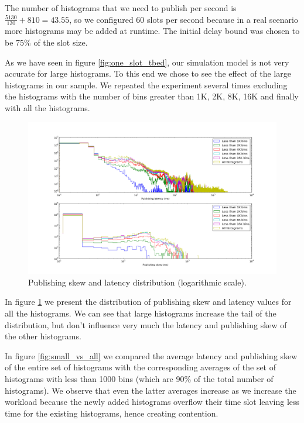 The number of histograms that we need to publish per second is $\frac {5130}{120} + {8}{10} = 43.55$, so we configured 60 slots per second because in a real scenario more histograms may be added at runtime. The initial delay bound was chosen to be 75\% of the slot size.

As we have seen in figure \ref{fig:one_slot_tbed}, our simulation model is not very accurate for large histograms. To this end we chose to see the effect of the large histograms in our sample. We repeated the experiment several times excluding the histograms with the number of bins greater than 1K, 2K, 8K, 16K and finally with all the histograms. 

\begin{figure}[ht]
\centering
\includegraphics[width=\textwidth]{Images/e2e_histograms.png}
\caption[Publishing skew and latency distribution.]{Publishing skew and latency distribution (logarithmic scale).}
\label{fig:e2e_histograms}
\end{figure}

In figure \ref{fig:e2e_histograms} we present the distribution of publishing skew and latency values for all the histograms. We can see that large histograms increase the tail of the distribution, but don't influence very much the latency and publishing skew of the other histograms.

In figure \ref{fig:small_vs_all} we compared the average latency and publishing skew of the entire set of histograms with the corresponding averages of the set of histograms with less than 1000 bins (which are 90\% of the total number of histograms). We observe that even the latter averages increase as we increase the workload because the newly added histograms overflow their time slot leaving less time for the existing histograms, hence creating contention. 

